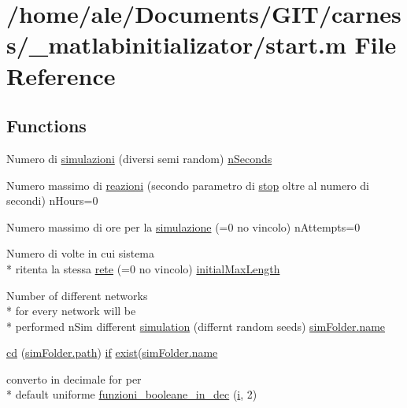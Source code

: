 \hypertarget{a00065}{\section{/home/ale/\-Documents/\-G\-I\-T/carness/\-\_\-matlabinitializator/start.m File Reference}
\label{a00065}
}
\subsection*{Functions}
\begin{DoxyCompactItemize}
\item 
Numero di \hyperlink{a00065_a1b273eb41d82b5ca6c9f74a3c0aa2855}{simulazioni} (diversi semi random) \hyperlink{a00064_aaded2f2d61413dc4bddf805e9be03ded}{n\-Seconds}
\item 
Numero massimo di \hyperlink{a00065_a69962f56e60d0c88abc5d4b6839c2886}{reazioni} (secondo parametro di \hyperlink{a00024_a6bd08e37edf4151f5f6d1fc27a6f227a}{stop} oltre al numero di secondi) n\-Hours=0
\item 
Numero massimo di ore per la \hyperlink{a00065_ad4ff287bf077be8ffb479fcc197bc548}{simulazione} (=0 no vincolo) n\-Attempts=0
\item 
Numero di volte in cui sistema \\*
ritenta la stessa \hyperlink{a00065_a40d2922f55b48d94c99038a8c2bef2ff}{rete} (=0 no vincolo) \hyperlink{a00064_a4c7433c24b6426a15069cc5a93a5cbec}{initial\-Max\-Length}
\item 
Number of different networks \\*
for every network will be \\*
performed n\-Sim different \hyperlink{a00065_a096e1441156fd2c744baece86d6b295c}{simulation} (differnt random seeds) \hyperlink{a00021_abbf559a76fab59203496b0847ab9502a}{sim\-Folder.\-name}
\item 
\hyperlink{a00065_abe327856a9ee2f30f3ccafe4dc9edf5e}{cd} (\hyperlink{a00065_af28466084b87af2cdc5c7b48f4661f2d}{sim\-Folder.\-path}) \hyperlink{a00024_a01d55766b8058903dd360b4bda71f9f5}{if} \hyperlink{a00026_ab41b8dc78dee42a1a5e5a33d8bf6eeb3}{exist}(\hyperlink{a00021_abbf559a76fab59203496b0847ab9502a}{sim\-Folder.\-name}
\item 
converto in decimale for per \\*
default uniforme \hyperlink{a00065_aca80ac3e93dabd95e623a51f90fb37b6}{funzioni\-\_\-booleane\-\_\-in\-\_\-dec} (\hyperlink{a00065_ad3efca1ea6e3333daf30719ee0501862}{i}, 2)
\end{DoxyCompactItemize}
